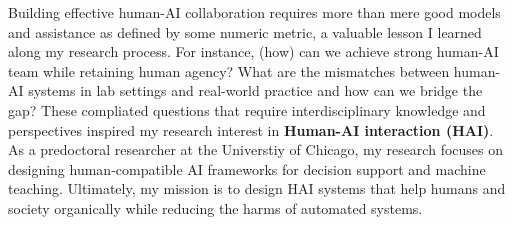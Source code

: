 




Building effective human-AI collaboration requires more than mere good models and assistance as defined by some numeric metric, a valuable lesson I learned along my research process. 
For instance, (how) can we achieve strong human-AI team while retaining human agency? What are the mismatches between human-AI systems in lab settings and real-world practice and how can we bridge the gap?
These compliated questions that require interdisciplinary knowledge and perspectives inspired my research interest in \textbf{Human-AI interaction (HAI)}. 
As a predoctoral researcher at the Universtiy of Chicago, my research focuses on designing human-compatible AI frameworks for decision support and machine teaching. 
Ultimately, my mission is to design HAI systems that help humans and society organically while reducing the harms of automated systems.



